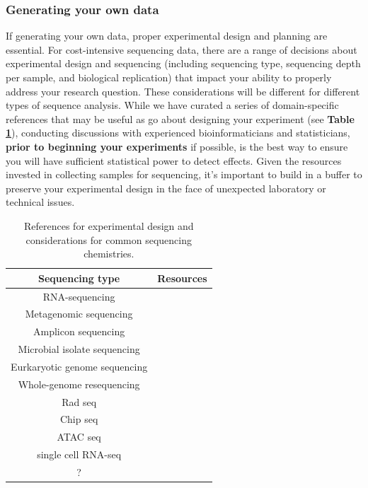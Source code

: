 \documentclass[10pt,letterpaper]{article}
\begin{document}

\subsubsection*{Generating your own data}
If generating your own data, proper experimental design and planning are essential. 
For cost-intensive sequencing data, there are a range of decisions about experimental design and sequencing (including sequencing type, sequencing depth per sample, and biological replication) that impact your ability to properly address your research question. 
These considerations will be different for different types of sequence analysis. 
While we have curated a series of domain-specific references that may be useful as go about designing your experiment (see \textbf{Table \ref{tab:seq_resources}}), conducting discussions with experienced bioinformaticians and statisticians, \textbf{prior to beginning your experiments} if possible, is the best way to ensure you will have sufficient statistical power to detect effects.
Given the resources invested in collecting samples for sequencing, it's important to build in a buffer to preserve your experimental design in the face of unexpected laboratory or technical issues. 

\begin{table}
\begin{tabular}{|c|c|}
\hline
\textbf{Sequencing type} & \textbf{Resources} \\
\hline
RNA-sequencing & \cite{conesa2016survey, schurch2016many, ching2014} \\
\hline
Metagenomic sequencing & \cite{knight2012, quince2017shotgun, eisenhofer2019} \\
\hline
Amplicon sequencing & \cite{mclaren2019, murray2015, sinha2017 } \\
\hline
Microbial isolate sequencing & \cite{liao2015} \\
\hline
Eurkaryotic genome sequencing & \\
\hline
Whole-genome resequencing & \cite{fuentes2017} \\
\hline
Rad seq & \\
\hline
Chip seq & \\
\hline
ATAC seq & \\
\hline
single cell RNA-seq & \cite{bacher2016, haque2017} \\
\hline
? & \\
\hline
\end{tabular} 
\caption{\label{tab:seq_resources} References for experimental design and considerations for common sequencing chemistries.}
\end{table}
\end{document}
